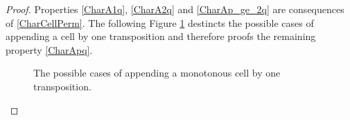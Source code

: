 \begin{proof}
    Properties \eqref{CharA1q}, \eqref{CharA2q} and \eqref{CharAp_ge_2q} are consequences of \eqref{CharCellPerm}.
    The following Figure \ref{complexity:Apq_recursion_lemma_figure} destincts the possible cases of appending a cell by one transposition and therefore proofs the remaining property \eqref{CharApq}.
    \begin{figure}[ht]
        \centering
        
        \hspace{10pt}
         \hspace{1cm}
        \hspace{10pt}
        
        \vspace{.5cm}
        
        \hspace{10pt}
         \hspace{1cm}
        \hspace{10pt}
    \caption{\label{complexity:Apq_recursion_lemma_figure}The possible cases of appending a monotonous cell by one transposition.}
    \end{figure}
\end{proof}

